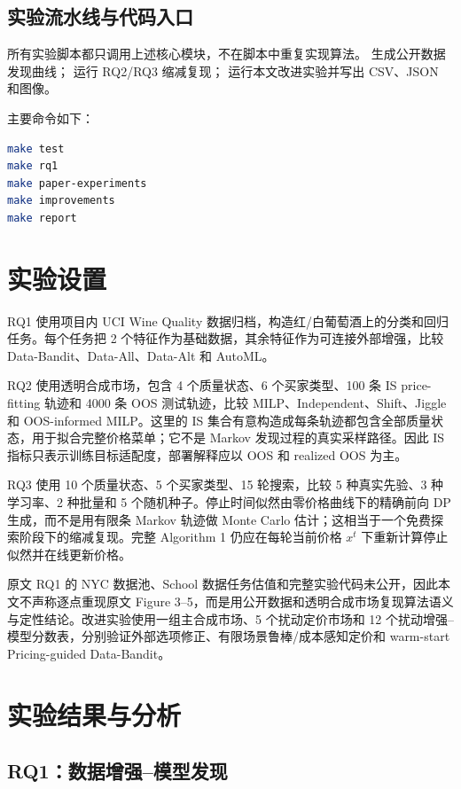 \documentclass[11pt,a4paper]{ctexart}
\theoremstyle{definition}
\begin{document}
\subsection{实验流水线与代码入口}

所有实验脚本都只调用上述核心模块，不在脚本中重复实现算法。  生成公开数据发现曲线； 运行 RQ2/RQ3 缩减复现； 运行本文改进实验并写出 CSV、JSON 和图像。

主要命令如下：
\begin{lstlisting}[language=bash]
make test
make rq1
make paper-experiments
make improvements
make report
\end{lstlisting}

\section{实验设置}

RQ1 使用项目内 UCI Wine Quality 数据归档，构造红/白葡萄酒上的分类和回归任务。每个任务把 2 个特征作为基础数据，其余特征作为可连接外部增强，比较 Data-Bandit、Data-All、Data-Alt 和 AutoML。

RQ2 使用透明合成市场，包含 4 个质量状态、6 个买家类型、100 条 IS price-fitting 轨迹和 4000 条 OOS 测试轨迹，比较 MILP、Independent、Shift、Jiggle 和 OOS-informed MILP。这里的 IS 集合有意构造成每条轨迹都包含全部质量状态，用于拟合完整价格菜单；它不是 Markov 发现过程的真实采样路径。因此 IS 指标只表示训练目标适配度，部署解释应以 OOS 和 realized OOS 为主。

RQ3 使用 10 个质量状态、5 个买家类型、15 轮搜索，比较 5 种真实先验、3 种学习率、2 种批量和 5 个随机种子。停止时间似然由零价格曲线下的精确前向 DP 生成，而不是用有限条 Markov 轨迹做 Monte Carlo 估计；这相当于一个免费探索阶段下的缩减复现。完整 Algorithm 1 仍应在每轮当前价格 $x^t$ 下重新计算停止似然并在线更新价格。

原文 RQ1 的 NYC 数据池、School 数据任务估值和完整实验代码未公开，因此本文不声称逐点重现原文 Figure 3--5，而是用公开数据和透明合成市场复现算法语义与定性结论。改进实验使用一组主合成市场、5 个扰动定价市场和 12 个扰动增强--模型分数表，分别验证外部选项修正、有限场景鲁棒/成本感知定价和 warm-start Pricing-guided Data-Bandit。

\section{实验结果与分析}

\subsection{RQ1：数据增强--模型发现}
\end{document}
